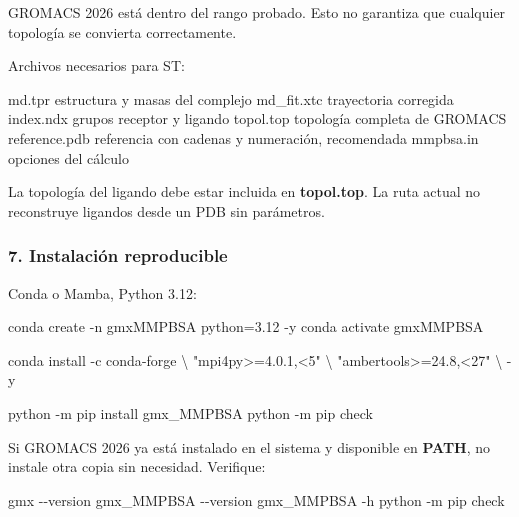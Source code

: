 \documentclass[
  spanish,
  11pt,
  a4paper]{article}
\newenvironment{Shaded}{\begin{snugshade}}{\end{snugshade}}
\newcommand{\AttributeTok}[1]{\textcolor[rgb]{0.13,0.29,0.53}{#1}}
\newcommand{\DataTypeTok}[1]{\textcolor[rgb]{0.13,0.29,0.53}{#1}}
\newcommand{\ExtensionTok}[1]{#1}
\newcommand{\NormalTok}[1]{#1}
\newcommand{\StringTok}[1]{\textcolor[rgb]{0.31,0.60,0.02}{#1}}
\begin{document}
GROMACS 2026 está dentro del rango probado. Esto no garantiza que
cualquier topología se convierta correctamente.

Archivos necesarios para ST:

\begin{Shaded}
\begin{Highlighting}[]
\NormalTok{md.tpr              estructura y masas del complejo}
\NormalTok{md\_fit.xtc          trayectoria corregida}
\NormalTok{index.ndx           grupos receptor y ligando}
\NormalTok{topol.top           topología completa de GROMACS}
\NormalTok{reference.pdb       referencia con cadenas y numeración, recomendada}
\NormalTok{mmpbsa.in           opciones del cálculo}
\end{Highlighting}
\end{Shaded}

La topología del ligando debe estar incluida en \textbf{topol.top}. La
ruta actual no reconstruye ligandos desde un PDB sin parámetros.

\subsubsection{7. Instalación
reproducible}\label{instalaciuxf3n-reproducible-1}

Conda o Mamba, Python 3.12:

\begin{Shaded}
\begin{Highlighting}[]
\ExtensionTok{conda}\NormalTok{ create }\AttributeTok{{-}n}\NormalTok{ gmxMMPBSA python=3.12 }\AttributeTok{{-}y}
\ExtensionTok{conda}\NormalTok{ activate gmxMMPBSA}

\ExtensionTok{conda}\NormalTok{ install }\AttributeTok{{-}c}\NormalTok{ conda{-}forge }\DataTypeTok{\textbackslash{}}
    \StringTok{"mpi4py\textgreater{}=4.0.1,\textless{}5"} \DataTypeTok{\textbackslash{}}
    \StringTok{"ambertools\textgreater{}=24.8,\textless{}27"} \DataTypeTok{\textbackslash{}}
    \AttributeTok{{-}y}

\ExtensionTok{python} \AttributeTok{{-}m}\NormalTok{ pip install gmx\_MMPBSA}
\ExtensionTok{python} \AttributeTok{{-}m}\NormalTok{ pip check}
\end{Highlighting}
\end{Shaded}

Si GROMACS 2026 ya está instalado en el sistema y disponible en
\textbf{PATH}, no instale otra copia sin necesidad. Verifique:

\begin{Shaded}
\begin{Highlighting}[]
\ExtensionTok{gmx} \AttributeTok{{-}{-}version}
\ExtensionTok{gmx\_MMPBSA} \AttributeTok{{-}{-}version}
\ExtensionTok{gmx\_MMPBSA} \AttributeTok{{-}h}
\ExtensionTok{python} \AttributeTok{{-}m}\NormalTok{ pip check}
\end{Highlighting}
\end{Shaded}
\end{document}
